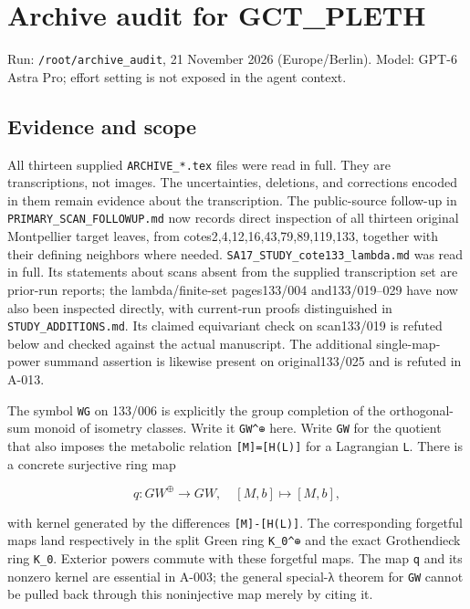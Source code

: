 \documentclass[
  10pt,
]{article}
\begin{document}
\section{Archive audit for
GCT\_PLETH}\label{archive-audit-for-gct_pleth}

Run:
\texttt{\small /\allowbreak{}root/\allowbreak{}archive\_\allowbreak{}audit},
21 November 2026 (Europe/Berlin). Model: GPT-6 Astra Pro; effort setting
is not exposed in the agent context.

\subsection{Evidence and scope}\label{evidence-and-scope}

All thirteen supplied \texttt{\small ARCHIVE\_\allowbreak{}*.tex} files
were read in full. They are transcriptions, not images. The
uncertainties, deletions, and corrections encoded in them remain
evidence about the transcription. The public-source follow-up in
\texttt{\small PRIMARY\_\allowbreak{}SCAN\_\allowbreak{}FOLLOWUP.md} now
records direct inspection of all thirteen original Montpellier target
leaves, from cotes2,4,12,16,43,79,89,119,133, together with their
defining neighbors where needed.
\texttt{\small SA17\_\allowbreak{}STUDY\_\allowbreak{}cote133\_\allowbreak{}lambda.md}
was read in full. Its statements about scans absent from the supplied
transcription set are prior-run reports; the lambda/finite-set
pages133/004 and133/019--029 have now also been inspected directly, with
current-run proofs distinguished in
\texttt{\small STUDY\_\allowbreak{}ADDITIONS.md}. Its claimed
equivariant check on scan133/019 is refuted below and checked against
the actual manuscript. The additional single-map-power summand assertion
is likewise present on original133/025 and is refuted in A-013.

The symbol \texttt{\small WG} on 133/006 is explicitly the group
completion of the orthogonal-sum monoid of isometry classes. Write it
\texttt{\small GW\textasciicircum{}⊕\allowbreak{}} here. Write
\texttt{\small GW} for the quotient that also imposes the metabolic
relation
\texttt{\small [\allowbreak{}M]\allowbreak{}=\allowbreak{}[\allowbreak{}H(\allowbreak{}L)\allowbreak{}]\allowbreak{}}
for a Lagrangian \texttt{\small L}. There is a concrete surjective ring
map

\[
q:GW^\oplus\longrightarrow GW,
\quad [M,b]\longmapsto[M,b],
\]

with kernel generated by the differences
\texttt{\small [\allowbreak{}M]\allowbreak{}-\allowbreak{}[\allowbreak{}H(\allowbreak{}L)\allowbreak{}]\allowbreak{}}.
The corresponding forgetful maps land respectively in the split Green
ring \texttt{\small K\_\allowbreak{}0\textasciicircum{}⊕\allowbreak{}}
and the exact Grothendieck ring \texttt{\small K\_\allowbreak{}0}.
Exterior powers commute with these forgetful maps. The map
\texttt{\small q} and its nonzero kernel are essential in A-003; the
general special-λ theorem for \texttt{\small GW} cannot be pulled back
through this noninjective map merely by citing it.
\end{document}
